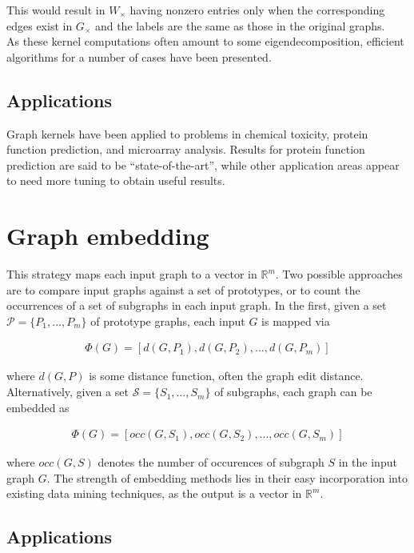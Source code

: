 \documentclass[11pt]{article}
\begin{document}
This would result in $W_\times$ having nonzero entries only when the corresponding edges exist in $G_\times$ and the labels are the same as those in the original graphs. \\
As these kernel computations often amount to some eigendecomposition, efficient algorithms for a number of cases have been presented.

\subsection{Applications}

Graph kernels have been applied to problems in chemical toxicity, protein function prediction, and microarray analysis. Results for protein function prediction are said to be ``state-of-the-art'', while other application areas appear to need more tuning to obtain useful results.

\section{Graph embedding}

This strategy maps each input graph to a vector in $\mathbb{R}^m$. Two possible approaches are to compare input graphs against a set of prototypes, or to count the occurrences of a set of subgraphs in each input graph. In the first, given a set $\mathcal{P} = \{P_1,...,P_m\}$ of prototype graphs, each input $G$ is mapped via

\begin{align}
\Phi(G)=[d(G,P_1), d(G,P_2),...,d(G,P_m)]
\end{align}

where $d(G, P)$ is some distance function, often the graph edit distance. Alternatively, given a set $\mathcal{S} = \{S_1,...,S_m\}$ of subgraphs, each graph can be embedded as

\begin{align}
\Phi(G)=[occ(G,S_1), occ(G,S_2),...,occ(G,S_m)]
\end{align}

where $occ(G, S)$ denotes the number of occurences of subgraph $S$ in the input graph $G$. The strength of embedding methods lies in their easy incorporation into existing data mining techniques, as the output is a vector in $\mathbb{R}^m$.

\subsection{Applications}
\end{document}
